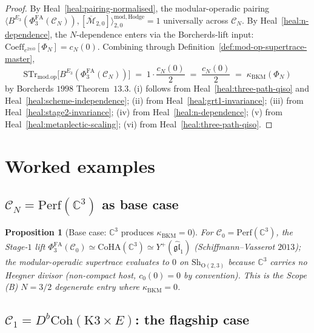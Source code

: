 \documentclass[11pt]{amsart}
\newtheorem{proposition}[theorem]{Proposition}
\providecommand{\C}{\mathbb{C}}
\providecommand{\cC}{\mathcal{C}}
\providecommand{\PhiFA}{\Phi^{\mathrm{FA}}}
\providecommand{\Mbar}{\overline{\mathcal{M}}}
\providecommand{\Perf}{\mathrm{Perf}}
\providecommand{\Coh}{\mathrm{Coh}}
\providecommand{\STr}{\mathrm{STr}}
\providecommand{\modop}{\mathrm{mod.op}}
\providecommand{\kBKM}{\kappa_{\mathrm{BKM}}}
\begin{document}
\begin{proof}[Proof]
By Heal~\ref{heal:pairing-normalised}, the
modular-operadic pairing $\bigl\langle B^{E_3}(\PhiFA_3(\cC_N)),
[\Mbar_{2, 0}]\bigr\rangle^{\mathrm{mod, Hodge}}_{2, 0} = 1$
universally across $\cC_N$. By
Heal~\ref{heal:n-dependence}, the $N$-dependence enters via the
Borcherds-lift input: $\mathrm{Coeff}_{e^{2\pi i 0}}[\Phi_N] = c_N(0)$.
Combining through
Definition~\ref{def:mod-op-supertrace-master},
\[
 \STr_{\modop}\bigl[B^{E_3}(\PhiFA_3(\cC_N))\bigr] \;=\;
 1 \cdot \frac{c_N(0)}{2} \;=\; \frac{c_N(0)}{2} \;=\;
 \kBKM(\Phi_N)
\]
by Borcherds $1998$ Theorem~$13.3$. (i) follows from
Heal~\ref{heal:three-path-qiso} and
Heal~\ref{heal:scheme-independence};
(ii) from Heal~\ref{heal:grt1-invariance};
(iii) from Heal~\ref{heal:stage2-invariance};
(iv) from Heal~\ref{heal:n-dependence};
(v) from Heal~\ref{heal:metaplectic-scaling};
(vi) from Heal~\ref{heal:three-path-qiso}.
\end{proof}

\section{Worked examples}
\label{sec:worked-examples}

\subsection{$\cC_N = \Perf(\C^3)$ as base case}

\begin{proposition}[Base case: $\C^3$ produces $\kBKM = 0$]
\label{prop:base-case-c3}
For $\cC_0 = \Perf(\C^3)$, the Stage-$1$ lift $\PhiFA_3(\cC_0) \simeq
\mathrm{CoHA}(\C^3) \simeq Y^+(\widehat{\mathfrak{gl}}_1)$
(Schiffmann--Vasserot $2013$); the modular-operadic supertrace
evaluates to $0$ on $\mathrm{Sh}_{\mathrm{O}(2, 3)}$ because
$\C^3$ carries no Heegner divisor (non-compact host, $c_0(0) = 0$ by
convention). This is the Scope (B) $N = 3/2$ degenerate entry where
$\kBKM = 0$.
\end{proposition}

\subsection{$\cC_1 = D^b\Coh(\mathrm{K3} \times E)$: the flagship case}
\end{document}
